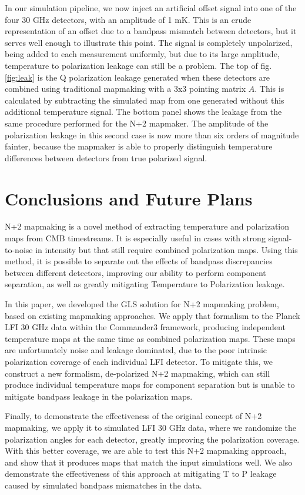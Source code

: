 \documentclass{aa}
\begin{document}
In our simulation pipeline, we now inject an artificial offset signal into one of the four 30 GHz detectors, with an amplitude of 1 mK. This is an crude representation of an offset due to a bandpass mismatch between detectors, but it serves well enough to illustrate this point. The signal is completely unpolarized, being added to each measurement uniformly, but due to its large amplitude, temperature to polarization leakage can still be a problem. The top of fig. \ref{fig:leak} is the Q polarization leakage generated when these detectors are combined using traditional mapmaking with a 3x3 pointing matrix $A$. This is calculated by subtracting the simulated map from one generated without this additional temperature signal. The bottom panel shows the leakage from the same procedure performed for the N+2 mapmaker. The amplitude of the polarization leakage in this second case is now more than six orders of magnitude fainter, because the mapmaker is able to properly distinguish temperature differences between detectors from true polarized signal. 

\section{Conclusions and Future Plans}
\label{sec:conclusions}

N+2 mapmaking is a novel method of extracting temperature and polarization maps from CMB timestreams. It is especially useful in cases with strong signal-to-noise in intensity but that still require combined polarization maps. Using this method, it is possible to separate out the effects of bandpass discrepancies between different detectors, improving our ability to perform component separation, as well as greatly mitigating Temperature to Polarization leakage. 

In this paper, we developed the GLS solution for N+2 mapmaking problem, based on existing mapmaking approaches. We apply that formalism to the Planck LFI 30 GHz data within the Commander3 framework, producing independent temperature maps at the same time as combined polarization maps. These maps are unfortunately noise and leakage dominated, due to the poor intrinsic polarization coverage of each individual LFI detector. To mitigate this, we construct a new formalism, de-polarized N+2 mapmaking, which can still produce individual temperature maps for component separation but is unable to mitigate bandpass leakage in the polarization maps. 

Finally, to demonstrate the effectiveness of the original concept of N+2 mapmaking, we apply it to simulated LFI 30 GHz data, where we randomize the polarization angles for each detector, greatly improving the polarization coverage. With this better coverage, we are able to test this N+2 mapmaking approach, and show that it produces maps that match the input simulations well. We also demonstrate the effectiveness of this approach at mitigating T to P leakage caused by simulated bandpass mismatches in the data. 
\end{document}
